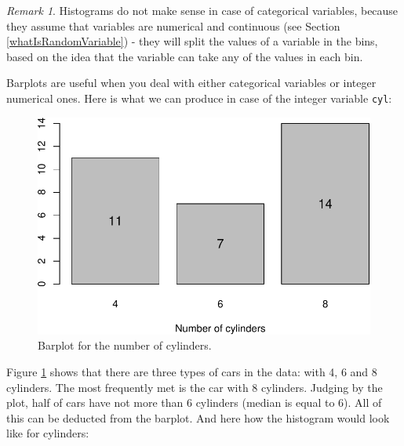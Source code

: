 \documentclass[
]{book}
\newenvironment{Shaded}{\begin{snugshade}}{\end{snugshade}}
\newcommand{\DataTypeTok}[1]{\textcolor[rgb]{0.13,0.29,0.53}{#1}}
\newcommand{\DecValTok}[1]{\textcolor[rgb]{0.00,0.00,0.81}{#1}}
\newcommand{\FloatTok}[1]{\textcolor[rgb]{0.00,0.00,0.81}{#1}}
\newcommand{\KeywordTok}[1]{\textcolor[rgb]{0.13,0.29,0.53}{\textbf{#1}}}
\newcommand{\NormalTok}[1]{#1}
\newcommand{\OperatorTok}[1]{\textcolor[rgb]{0.81,0.36,0.00}{\textbf{#1}}}
\newcommand{\StringTok}[1]{\textcolor[rgb]{0.31,0.60,0.02}{#1}}
\theoremstyle{definition}
\theoremstyle{definition}
\theoremstyle{definition}
\theoremstyle{definition}
\theoremstyle{remark}
\newtheorem*{remark}{Remark}
\begin{document}
\begin{remark}
Histograms do not make sense in case of categorical variables, because they assume that variables are numerical and continuous (see Section \ref{whatIsRandomVariable}) - they will split the values of a variable in the bins, based on the idea that the variable can take any of the values in each bin.
\end{remark}

Barplots are useful when you deal with either categorical variables or integer numerical ones. Here is what we can produce in case of the integer variable \texttt{cyl}:

\begin{Shaded}
\end{Shaded}

\begin{figure}
\centering
\includegraphics{Svetunkov---Statistics-for-Business-Analytics_files/figure-latex/barplotCYL-1.pdf}
\caption{\label{fig:barplotCYL}Barplot for the number of cylinders.}
\end{figure}

Figure \ref{fig:barplotCYL} shows that there are three types of cars in the data: with 4, 6 and 8 cylinders. The most frequently met is the car with 8 cylinders. Judging by the plot, half of cars have not more than 6 cylinders (median is equal to 6). All of this can be deducted from the barplot. And here how the histogram would look like for cylinders:
\end{document}
